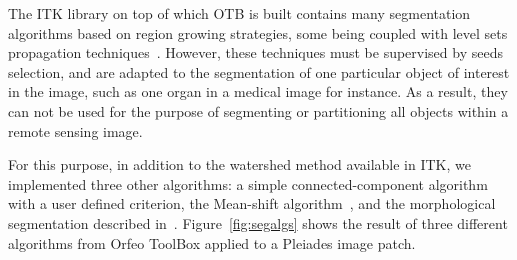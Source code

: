 \documentclass{josis}
\begin{document}
The ITK library on top of which OTB is built contains many
segmentation algorithms based on region growing strategies, some being
coupled with level sets propagation
techniques~\cite{otbSoftwareGuide}. However, these techniques must be
supervised by seeds selection, and are adapted to the segmentation of
one particular object of interest in the image, such as one organ in a
medical image for instance. As a result, they can not be used for the
purpose of segmenting or partitioning all objects within a remote
sensing image.

For this purpose, in addition to the watershed method available in ITK, we
implemented three other algorithms: a simple connected-component algorithm with
a user defined criterion, the Mean-shift algorithm~\cite{comaniciu2002mean}, and
the morphological segmentation described
in~\cite{pesaresi2001new}. Figure~\ref{fig:segalgs} shows the result of three
different algorithms from Orfeo ToolBox applied to a Pleiades image patch.
\end{document}
